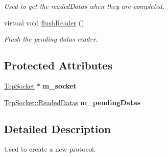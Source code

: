 \begin{DoxyCompactItemize}
\begin{DoxyCompactList}\small\item\em Used to get the readed\-Datas when they are completed. \end{DoxyCompactList}\item 
\hypertarget{classmognetwork_1_1protocol_1_1_a_protocol_listener_aedfd6ac78d772a01f9ecaebbb1aa9d75}{virtual void \hyperlink{classmognetwork_1_1protocol_1_1_a_protocol_listener_aedfd6ac78d772a01f9ecaebbb1aa9d75}{flush\-Reader} ()}\label{classmognetwork_1_1protocol_1_1_a_protocol_listener_aedfd6ac78d772a01f9ecaebbb1aa9d75}

\begin{DoxyCompactList}\small\item\em Flush the pending datas reader. \end{DoxyCompactList}\end{DoxyCompactItemize}
\subsection*{Protected Attributes}
\begin{DoxyCompactItemize}
\item 
\hypertarget{classmognetwork_1_1protocol_1_1_a_protocol_listener_a98c0c5674b4ab62d2da3e9a1a9aac472}{\hyperlink{classmognetwork_1_1_tcp_socket}{Tcp\-Socket} $\ast$ {\bfseries m\-\_\-socket}}\label{classmognetwork_1_1protocol_1_1_a_protocol_listener_a98c0c5674b4ab62d2da3e9a1a9aac472}

\item 
\hypertarget{classmognetwork_1_1protocol_1_1_a_protocol_listener_a7a7d9c755d2610894ffff31ed4c744cb}{\hyperlink{structmognetwork_1_1_tcp_socket_1_1_readed_datas}{Tcp\-Socket\-::\-Readed\-Datas} {\bfseries m\-\_\-pending\-Datas}}\label{classmognetwork_1_1protocol_1_1_a_protocol_listener_a7a7d9c755d2610894ffff31ed4c744cb}

\end{DoxyCompactItemize}


\subsection{Detailed Description}
Used to create a new protocol. 


